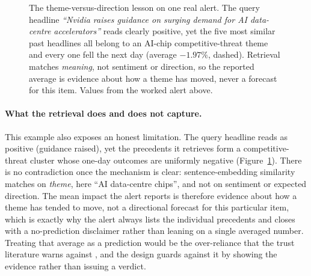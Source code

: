 \begin{figure}[ht]
\centering
{}
\caption[Same theme, opposite direction]{The theme-versus-direction lesson on one real alert. The query
headline \emph{``Nvidia raises guidance on surging demand for AI data-centre accelerators''} reads
clearly positive, yet the five most similar past headlines all belong to an AI-chip competitive-threat
theme and every one fell the next day (average $-1.97\%$, dashed). Retrieval matches \emph{meaning}, not
sentiment or direction, so the reported average is evidence about how a theme has moved, never a forecast
for this item. Values from the worked alert above.}
\label{fig:theme_direction}
\end{figure}

\paragraph{What the retrieval does and does not capture.}
This example also exposes an honest limitation. The query headline reads as positive (guidance raised),
yet the precedents it retrieves form a competitive-threat cluster whose one-day outcomes are uniformly
negative (Figure~\ref{fig:theme_direction}). There is no contradiction once the mechanism is clear: sentence-embedding similarity matches on
\emph{theme}, here ``AI data-centre chips'', and not on sentiment or expected direction. The mean impact
the alert reports is therefore evidence about how a theme has tended to move, not a directional forecast
for this particular item, which is exactly why the alert always lists the individual precedents and closes
with a no-prediction disclaimer rather than leaning on a single averaged number. Treating that average as a
prediction would be the over-reliance that the trust literature warns against
\autocite{lee2004trust, bansal2021whole}, and the design guards against it by showing the evidence rather
than issuing a verdict.


